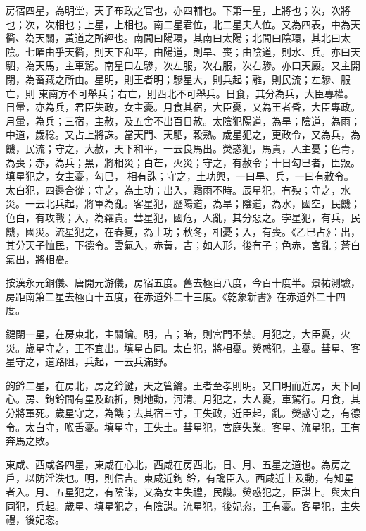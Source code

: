 \begin{pinyinscope}
 房宿四星，為明堂，天子布政之官也，亦四輔也。下第一星，上將也；次，次將也；次，次相也；上星，上相也。南二星君位，北二星夫人位。又為四表，中為天衢、為天關，黃道之所經也。南間曰陽環，其南曰太陽；北間曰陰環，其北曰太陰。七曜由乎天衢，則天下和平，由陽道，則旱、喪；由陰道，則水、兵。亦曰天駟，為天馬，主車駕。南星曰左驂，次左服，次右服，次右驂。亦曰天廄。又主開閉，為畜藏之所由。星明，則王者明；驂星大，則兵起；離，則民流；左驂、服亡，則
 東南方不可舉兵；右亡，則西北不可舉兵。日食，其分為兵，大臣專權。日暈，亦為兵，君臣失政，女主憂。月食其宿，大臣憂，又為王者昏，大臣專政。月暈，為兵；三宿，主赦，及五舍不出百日赦。太陰犯陽道，為旱；陰道，為雨；中道，歲稔。又占上將誅。當天門、天駟，穀熟。歲星犯之，更政令，又為兵，為饑，民流；守之，大赦，天下和平，一云良馬出。熒惑犯，馬貴，人主憂；色青，為喪；赤，為兵；黑，將相災；白芒，火災；守之，有赦令；十日勾巳者，臣叛。填星犯之，女主憂，勾巳，
 相有誅；守之，土功興，一曰旱、兵，一曰有赦令。太白犯，四邊合從；守之，為土功；出入，霜雨不時。辰星犯，有殃；守之，水災。一云北兵起，將軍為亂。客星犯，歷陽道，為旱；陰道，為水，國空，民饑；色白，有攻戰；入，為糴貴。彗星犯，國危，人亂，其分惡之。孛星犯，有兵，民饑，國災。流星犯之，在春夏，為土功；秋冬，相憂；入，有喪。《乙巳占》：出，其分天子恤民，下德令。雲氣入，赤黃，吉；如人形，後有子；色赤，宮亂；蒼白氣出，將相憂。



 按漢永元銅儀、唐開元游儀，房宿五度。舊去極百八度，今百十度半。景祐測驗，房距南第二星去極百十五度，在赤道外二十三度。《乾象新書》在赤道外二十四度。



 鍵閉一星，在房東北，主關鑰。明，吉；暗，則宮門不禁。月犯之，大臣憂，火災。歲星守之，王不宜出。填星占同。太白犯，將相憂。熒惑犯，主憂。彗星、客星守之，道路阻，兵起，一云兵滿野。



 鉤鈐二星，在房北，房之鈐鍵，天之管鑰。王者至孝則明。又曰明而近房，天下同心。房、鉤鈐間有星及疏折，則地動，河清。月犯之，大人憂，車駕行。月食，其分將軍死。歲星守之，為饑；去其宿三寸，王失政，近臣起，亂。熒惑守之，有德令。太白守，喉舌憂。填星守，王失土。彗星犯，宮庭失業。客星、流星犯，王有奔馬之敗。



 東咸、西咸各四星，東咸在心北，西咸在房西北，日、月、五星之道也。為房之戶，以防淫泆也。明，則信吉。東咸近鉤
 鈐，有讒臣入。西咸近上及動，有知星者入。月、五星犯之，有陰謀，又為女主失禮，民饑。熒惑犯之，臣謀上。與太白同犯，兵起。歲星、填星犯之，有陰謀。流星犯，後妃恣，王有憂。客星犯，主失禮，後妃恣。




\end{pinyinscope}
